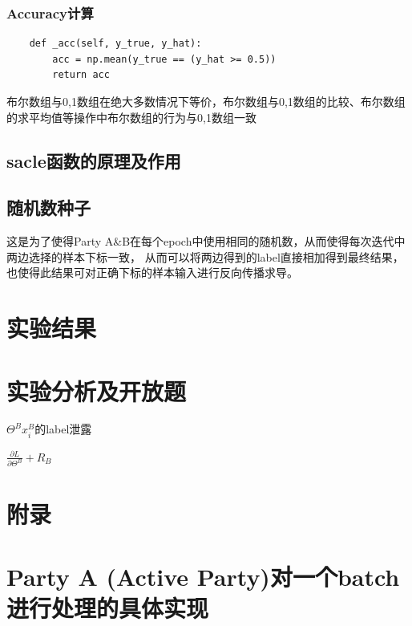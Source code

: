 \documentclass[twoside,11pt]{article}
\begin{document}
\subsubsection{Accuracy计算}

\begin{lstlisting}
    def _acc(self, y_true, y_hat):
        acc = np.mean(y_true == (y_hat >= 0.5))
        return acc
\end{lstlisting}

布尔数组与0,1数组在绝大多数情况下等价，布尔数组与0,1数组的比较、布尔数组的求平均值等操作中布尔数组的行为与0,1数组一致




\subsection{sacle函数的原理及作用}



\subsection{随机数种子}

这是为了使得Party A\&B在每个epoch中使用相同的随机数，从而使得每次迭代中两边选择的样本下标一致，
从而可以将两边得到的label直接相加得到最终结果，也使得此结果可对正确下标的样本输入进行反向传播求导。


\section{实验结果}




\section{实验分析及开放题}

$\Theta^B x_i^B$的label泄露

$\frac{\partial L}{\partial \Theta^B}+R_B$

\appendix
\section*{附录}

\section{Party A (Active Party)对一个batch进行处理的具体实现}
\end{document}
